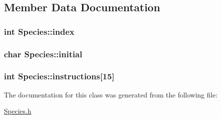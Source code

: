 \subsection{Member Data Documentation}
\hypertarget{classSpecies_ad5e7baa27db7470d31a32413447fd28e}{
\subsubsection[{index}]{\setlength{\rightskip}{0pt plus 5cm}int Species\-::index\hspace{0.3cm}{\ttfamily [private]}}}\label{classSpecies_ad5e7baa27db7470d31a32413447fd28e}
\hypertarget{classSpecies_a753163804f97c066bcb02b20ebd77938}{
\subsubsection[{initial}]{\setlength{\rightskip}{0pt plus 5cm}char Species\-::initial\hspace{0.3cm}{\ttfamily [private]}}}\label{classSpecies_a753163804f97c066bcb02b20ebd77938}
\hypertarget{classSpecies_a4a713cda9f08caa176cf2da23ec266d0}{
\subsubsection[{instructions}]{\setlength{\rightskip}{0pt plus 5cm}int Species\-::instructions\mbox{[}15\mbox{]}\hspace{0.3cm}{\ttfamily [private]}}}\label{classSpecies_a4a713cda9f08caa176cf2da23ec266d0}


The documentation for this class was generated from the following file\-:\begin{DoxyCompactItemize}
\item 
\hyperlink{Species_8h}{Species.\-h}\end{DoxyCompactItemize}
